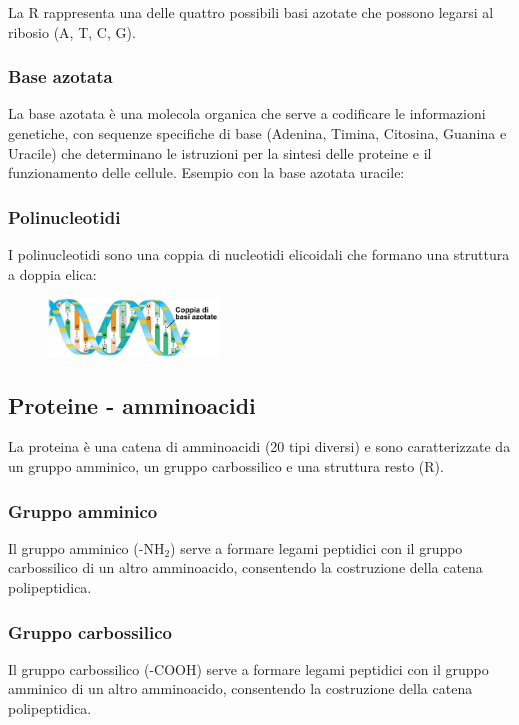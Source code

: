 \documentclass{article}
\newcommand{\figbox}[1]{
    \begin{figure}[ht!]
        \begin{center}
            \fbox{#1}
        \end{center}
    \end{figure}
}
\newcommand*\circled[1]{\tikz[baseline=(char.base)]{
            \node[shape=circle,draw,inner sep=1.1pt] (char) {#1};}
}
\begin{document}
La {\color{red}R} rappresenta una delle quattro possibili basi azotate che possono legarsi
al ribosio (A, T, C, G).

\subsubsection{Base azotata}
La base azotata è una molecola organica che serve a codificare le informazioni genetiche,
con sequenze specifiche di base (Adenina, Timina, Citosina, Guanina e Uracile) che determinano
le istruzioni per la sintesi delle proteine e il funzionamento delle cellule.
Esempio con la base azotata uracile:
\figbox{
    \chemfig{
        [:60]R-[:90]N*6(-(=[:-30]O)-N-(=[:90]O)-=-)
    }
}

\subsubsection{Polinucleotidi}
I polinucleotidi sono una coppia di nucleotidi elicoidali che formano una struttura a doppia
elica:
\begin{figure}[ht!]
    \begin{center}
        \includegraphics[width=0.4\textwidth]{media/doppia_elica.png}
    \end{center}
\end{figure}

\subsection{Proteine - amminoacidi}
La proteina è una catena di amminoacidi (20 tipi diversi) e sono caratterizzate da un gruppo
amminico, un gruppo carbossilico e una struttura resto (R).
\figbox{
    \chemfig{
        N(-[:135]H)(-[:-135]H)-\circled{C}(-[:90]H)(-[:-90]R)-C(=[:45]O)(-[:-45]OH)
    }
}

\subsubsection{Gruppo amminico}
Il gruppo amminico (-NH$_2$) serve a formare legami peptidici con il gruppo carbossilico di un
altro amminoacido, consentendo la costruzione della catena polipeptidica.

\subsubsection{Gruppo carbossilico}
Il gruppo carbossilico (-COOH) serve a formare legami peptidici con il gruppo amminico di un
altro amminoacido, consentendo la costruzione della catena polipeptidica.
\end{document}
